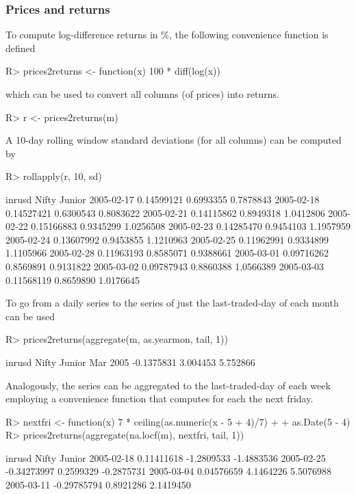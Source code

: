 \documentclass[article,nojss]{jss}
\newcommand{\mysection}[1]{\subsubsection[#1]{\textbf{#1}}}
\begin{document}
\mysection{Prices and returns}

To compute log-difference returns in \%, the following
convenience function is defined
\begin{Schunk}
\begin{Sinput}
R> prices2returns <- function(x) 100 * diff(log(x))
\end{Sinput}
\end{Schunk}
which can be used to convert all columns (of prices) into returns.
\begin{Schunk}
\begin{Sinput}
R> r <- prices2returns(m)
\end{Sinput}
\end{Schunk}

A 10-day rolling window standard deviations (for all columns) can
be computed by
\begin{Schunk}
\begin{Sinput}
R> rollapply(r, 10, sd)
\end{Sinput}
\begin{Soutput}
               inrusd     Nifty    Junior
2005-02-17 0.14599121 0.6993355 0.7878843
2005-02-18 0.14527421 0.6300543 0.8083622
2005-02-21 0.14115862 0.8949318 1.0412806
2005-02-22 0.15166883 0.9345299 1.0256508
2005-02-23 0.14285470 0.9454103 1.1957959
2005-02-24 0.13607992 0.9453855 1.1210963
2005-02-25 0.11962991 0.9334899 1.1105966
2005-02-28 0.11963193 0.8585071 0.9388661
2005-03-01 0.09716262 0.8569891 0.9131822
2005-03-02 0.09787943 0.8860388 1.0566389
2005-03-03 0.11568119 0.8659890 1.0176645
\end{Soutput}
\end{Schunk}

To go from a daily series to the series of just the last-traded-day of each month
 can be used
\begin{Schunk}
\begin{Sinput}
R> prices2returns(aggregate(m, as.yearmon, tail, 1))
\end{Sinput}
\begin{Soutput}
             inrusd    Nifty   Junior
Mar 2005 -0.1375831 3.004453 5.752866
\end{Soutput}
\end{Schunk}

Analogously, the series can be aggregated to the last-traded-day of each week
employing a convenience function  that computes for each 
the next friday.
\begin{Schunk}
\begin{Sinput}
R> nextfri <- function(x) 7 * ceiling(as.numeric(x - 5 + 4)/7) + 
+     as.Date(5 - 4)
R> prices2returns(aggregate(na.locf(m), nextfri, tail, 1))
\end{Sinput}
\begin{Soutput}
                inrusd      Nifty     Junior
2005-02-18  0.11411618 -1.2809533 -1.4883536
2005-02-25 -0.34273997  0.2599329 -0.2875731
2005-03-04  0.04576659  4.1464226  5.5076988
2005-03-11 -0.29785794  0.8921286  2.1419450
\end{Soutput}
\end{Schunk}
\end{document}
